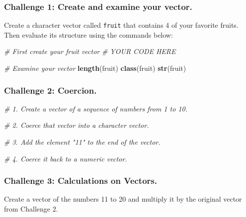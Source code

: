 \documentclass[]{book}
\newenvironment{Shaded}{\begin{snugshade}}{\end{snugshade}}
\newcommand{\KeywordTok}[1]{\textcolor[rgb]{0.13,0.29,0.53}{\textbf{#1}}}
\newcommand{\CommentTok}[1]{\textcolor[rgb]{0.56,0.35,0.01}{\textit{#1}}}
\newcommand{\NormalTok}[1]{#1}
\begin{document}
\subsubsection*{Challenge 1: Create and examine your
vector.}\label{challenge-1-create-and-examine-your-vector.}

Create a character vector called \texttt{fruit} that contains 4 of your
favorite fruits. Then evaluate its structure using the commands below:

\begin{Shaded}
\begin{Highlighting}[]

\CommentTok{# First create your fruit vector }
\CommentTok{# YOUR CODE HERE}


\CommentTok{# Examine your vector}
\KeywordTok{length}\NormalTok{(fruit)}
\KeywordTok{class}\NormalTok{(fruit)}
\KeywordTok{str}\NormalTok{(fruit)}
\end{Highlighting}
\end{Shaded}

\subsubsection*{Challenge 2: Coercion.}\label{challenge-2-coercion.}

\begin{Shaded}
\begin{Highlighting}[]

\CommentTok{# 1. Create a vector of a sequence of numbers from 1 to 10.}

\CommentTok{# 2. Coerce that vector into a character vector.}

\CommentTok{# 3. Add the element "11" to the end of the vector.}

\CommentTok{# 4. Coerce it back to a numeric vector.}
\end{Highlighting}
\end{Shaded}

\subsubsection*{Challenge 3: Calculations on
Vectors.}\label{challenge-3-calculations-on-vectors.}

Create a vector of the numbers 11 to 20 and multiply it by the original
vector from Challenge 2.
\end{document}
